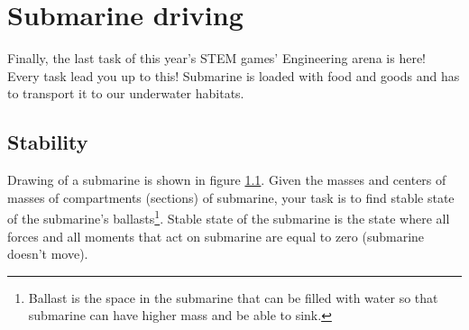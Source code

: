 \documentclass{article}
\begin{document}
\section{Submarine driving}
	
Finally, the last task of this year's STEM games' Engineering arena is here! Every task lead you up to this! Submarine is loaded with food and goods and has to transport it to our underwater habitats.

\subsection{Stability}

Drawing of a submarine is shown in figure \ref{}. %
Given the masses and centers of masses of compartments (sections) of submarine, your task is to find stable state of the submarine's ballasts\footnote{Ballast is the space in the submarine that can be filled with water so that submarine can have higher mass and be able to sink.}. Stable state of the submarine is the state where all forces and all moments that act on submarine are equal to zero (submarine doesn't move).
\end{document}
